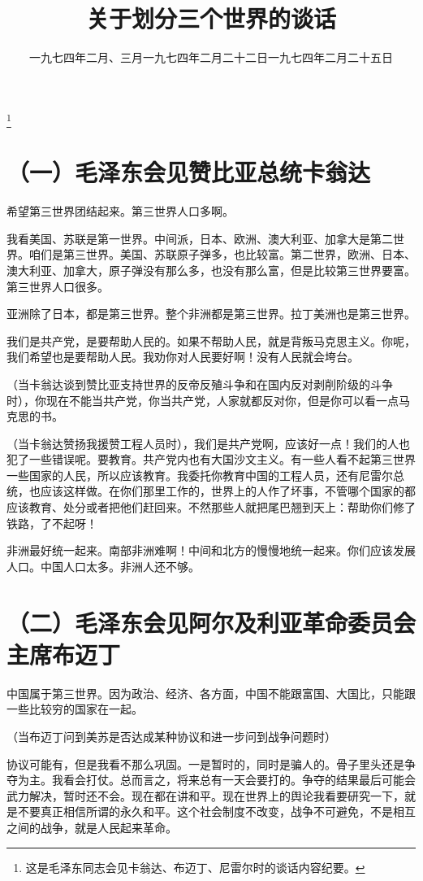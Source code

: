 
\title{关于划分三个世界的谈话}
\date{一九七四年二月、三月}
\thanks{这是毛泽东同志会见卡翁达、布迈丁、尼雷尔时的谈话内容纪要。}
\maketitle


\date{一九七四年二月二十二日}
\section{（一）毛泽东会见赞比亚总统卡翁达}

希望第三世界团结起来。第三世界人口多啊。

我看美国、苏联是第一世界。中间派，日本、欧洲、澳大利亚、加拿大是第二世界。咱们是第三世界。美国、苏联原子弹多，也比较富。第二世界，欧洲、日本、澳大利亚、加拿大，原子弹没有那么多，也没有那么富，但是比较第三世界要富。第三世界人口很多。

亚洲除了日本，都是第三世界。整个非洲都是第三世界。拉丁美洲也是第三世界。

我们是共产党，是要帮助人民的。如果不帮助人民，就是背叛马克思主义。你呢，我们希望也是要帮助人民。我劝你对人民要好啊！没有人民就会垮台。

（当卡翁达谈到赞比亚支持世界的反帝反殖斗争和在国内反对剥削阶级的斗争时），你现在不能当共产党，你当共产党，人家就都反对你，但是你可以看一点马克思的书。

（当卡翁达赞扬我援赞工程人员时），我们是共产党啊，应该好一点！我们的人也犯了一些错误呢。要教育。共产党内也有大国沙文主义。有一些人看不起第三世界一些国家的人民，所以应该教育。我委托你教育中国的工程人员，还有尼雷尔总统，也应该这样做。在你们那里工作的，世界上的人作了坏事，不管哪个国家的都应该教育、处分或者把他们赶回来。不然那些人就把尾巴翘到天上：帮助你们修了铁路，了不起呀！

非洲最好统一起来。南部非洲难啊！中间和北方的慢慢地统一起来。你们应该发展人口。中国人口太多。非洲人还不够。

\date{一九七四年二月二十五日}
\section{（二）毛泽东会见阿尔及利亚革命委员会主席布迈丁}

中国属于第三世界。因为政治、经济、各方面，中国不能跟富国、大国比，只能跟一些比较穷的国家在一起。

（当布迈丁问到美苏是否达成某种协议和进一步问到战争问题时）

协议可能有，但是我看不那么巩固。一是暂时的，同时是骗人的。骨子里头还是争夺为主。我看会打仗。总而言之，将来总有一天会要打的。争夺的结果最后可能会武力解决，暂时还不会。现在都在讲和平。现在世界上的舆论我看要研究一下，就是不要真正相信所谓的永久和平。这个社会制度不改变，战争不可避免，不是相互之间的战争，就是人民起来革命。

